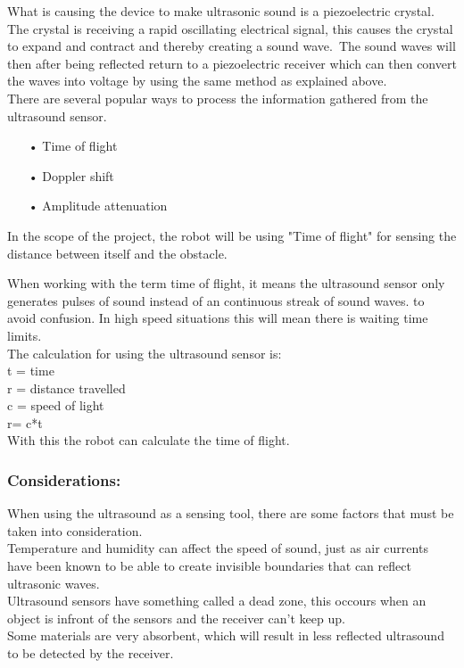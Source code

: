 What is causing the device to make ultrasonic sound is a piezoelectric crystal. The crystal is receiving a rapid oscillating electrical signal, this causes the crystal to expand and contract and thereby creating a sound wave.\ The sound waves will then after being reflected return to a piezoelectric receiver which can then convert the waves into voltage by using the same method as explained above. \\


There are several popular ways to process the information gathered from the ultrasound sensor. \\

\begin{enumerate}
	\item[•]Time of flight
	\item[•]Doppler shift
	\item[•]Amplitude attenuation
\end{enumerate}

In the scope of the project, the robot will be using "Time of flight" for sensing the distance between itself and the obstacle.\

When working with the term time of flight, it means the ultrasound sensor only generates pulses of sound instead of an continuous streak of sound waves. to avoid confusion. In high speed situations this will mean there is waiting time limits.\\ 

The calculation for using the ultrasound sensor is: \\

t = time\\
r = distance travelled\\
c = speed of light\\

r= c*t\\

With this the robot can calculate the time of flight.\

\subsubsection{Considerations:}
When using the ultrasound as a sensing tool, there are some factors that must be taken into consideration.\\ Temperature and humidity can affect the speed of sound, just as air currents have been known to be able to create invisible boundaries that can reflect ultrasonic waves.\\
Ultrasound sensors have something called a dead zone, this occours when an object is infront of the sensors and the receiver can't keep up.\\
Some materials are very absorbent, which will result in less reflected ultrasound to be detected by the receiver.

